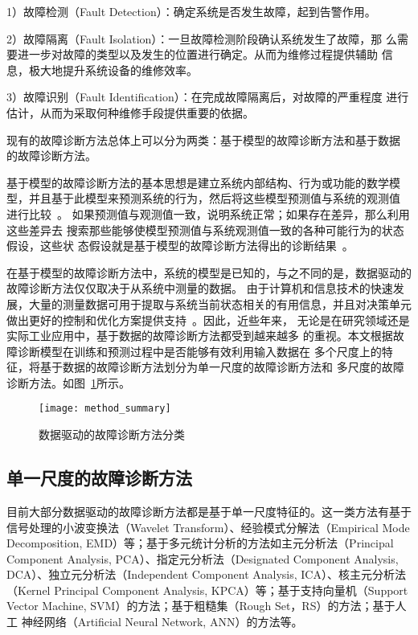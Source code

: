 1）故障检测（Fault Detection）：确定系统是否发生故障，起到告警作用。

2）故障隔离（Fault Isolation）：一旦故障检测阶段确认系统发生了故障，那
么需要进一步对故障的类型以及发生的位置进行确定。从而为维修过程提供辅助
信息，极大地提升系统设备的维修效率。

3）故障识别（Fault Identification）：在完成故障隔离后，对故障的严重程度
进行估计，从而为采取何种维修手段提供重要的依据。

现有的故障诊断方法总体上可以分为两类：基于模型的故障诊断方法和基于数据
的故障诊断方法。

基于模型的故障诊断方法的基本思想是建立系统内部结构、行为或功能的数学模
型，并且基于此模型来预测系统的行为，然后将这些模型预测值与系统的观测值
进行比较~\cite{console1999model, davis1988model, mosterman1998comprehensive}。
如果预测值与观测值一致，说明系统正常；如果存在差异，那么利用这些差异去
搜索那些能够使模型预测值与系统观测值一致的各种可能行为的状态假设，这些状
态假设就是基于模型的故障诊断方法得出的诊断结果~\cite{wotawa2000debugging, friedrich1999model}。

在基于模型的故障诊断方法中，系统的模型是已知的，与之不同的是，数据驱动的
故障诊断方法仅仅取决于从系统中测量的数据。 由于计算机和信息技术的快速发
展，大量的测量数据可用于提取与系统当前状态相关的有用信息，并且对决策单元
做出更好的控制和优化方案提供支持~\cite{yin2012comparison}。因此，近些年来，
无论是在研究领域还是实际工业应用中，基于数据的故障诊断方法都受到越来越多
的重视。本文根据故障诊断模型在训练和预测过程中是否能够有效利用输入数据在
多个尺度上的特征，将基于数据的故障诊断方法划分为单一尺度的故障诊断方法和
多尺度的故障诊断方法。如图~\ref{fig:method_summary}所示。
\begin{figure}[ht]
  \centering
  \texttt{[image: method\_summary]}
  \caption{数据驱动的故障诊断方法分类}
  \label{fig:method_summary}
\end{figure}

\subsection{单一尺度的故障诊断方法}

目前大部分数据驱动的故障诊断方法都是基于单一尺度特征的。这一类方法有基于
信号处理的小波变换法（Wavelet Transform）、经验模式分解法（Empirical Mode
Decomposition, EMD）等；基于多元统计分析的方法如主元分析法（Principal
Component Analysis, PCA）、指定元分析法（Designated Component Analysis,
DCA）、独立元分析法（Independent Component Analysis, ICA）、核主元分析法
（Kernel Principal Component Analysis, KPCA）等；基于支持向量机（Support
Vector Machine, SVM）的方法；基于粗糙集（Rough Set，RS）的方法；基于人工
神经网络（Artificial Neural Network, ANN）的方法等。

